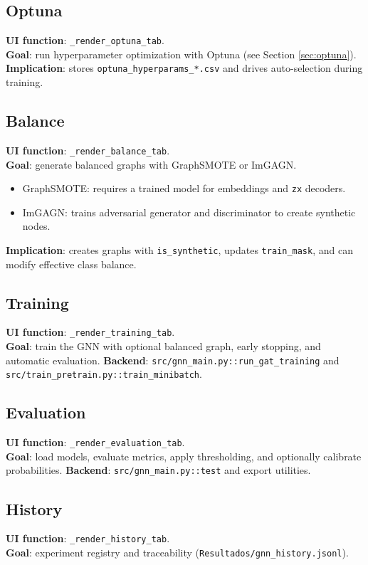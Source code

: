 \subsection{Optuna}
\textbf{UI function}: \texttt{\_render\_optuna\_tab}.\\
\textbf{Goal}: run hyperparameter optimization with Optuna (see Section \ref{sec:optuna}).
\textbf{Implication}: stores \texttt{optuna\_hyperparams\_*.csv} and drives auto-selection during training.

\subsection{Balance}
\textbf{UI function}: \texttt{\_render\_balance\_tab}.\\
\textbf{Goal}: generate balanced graphs with GraphSMOTE or ImGAGN.
\begin{itemize}[leftmargin=*]
  \item GraphSMOTE: requires a trained model for embeddings and \texttt{z\textrightarrow x} decoders.
  \item ImGAGN: trains adversarial generator and discriminator to create synthetic nodes.
\end{itemize}
\textbf{Implication}: creates graphs with \texttt{is\_synthetic}, updates \texttt{train\_mask}, and can modify effective class balance.

\subsection{Training}
\textbf{UI function}: \texttt{\_render\_training\_tab}.\\
\textbf{Goal}: train the GNN with optional balanced graph, early stopping, and automatic evaluation.
\textbf{Backend}: \texttt{src/gnn\_main.py::run\_gat\_training} and \texttt{src/train\_pretrain.py::train\_minibatch}.

\subsection{Evaluation}
\textbf{UI function}: \texttt{\_render\_evaluation\_tab}.\\
\textbf{Goal}: load models, evaluate metrics, apply thresholding, and optionally calibrate probabilities.
\textbf{Backend}: \texttt{src/gnn\_main.py::test} and export utilities.

\subsection{History}
\textbf{UI function}: \texttt{\_render\_history\_tab}.\\
\textbf{Goal}: experiment registry and traceability (\texttt{Resultados/gnn\_history.jsonl}).

